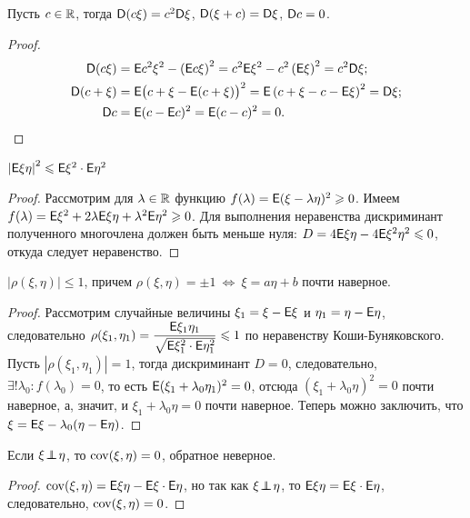 \begin{property}
	Пусть $c \in \mathbb{R}$, тогда $\mathsf{D} (c \xi ) = c^2 \mathsf{D} \xi$, $\mathsf{D} (\xi + c ) =  \mathsf{D} \xi$, $\mathsf{D} c = 0$.
	\begin{proof}
		\vspace{-2pc}
		\begin{align*}
			\mathsf{D} (c \xi ) &= \mathsf{E} c^2 \xi^2 - \left( \mathsf{E} c \xi \right)^2 = c^2 \mathsf{E} \xi^2 - c^2 \left( \mathsf{E} \xi \right)^2 = c^2 \mathsf{D} \xi;\\
			\mathsf{D} ( c + \xi ) &= \mathsf{E} \big( c + \xi - \mathsf{E} ( c + \xi ) \big)^2 = \mathsf{E} \left( c + \xi - c - \mathsf{E} \xi  \right)^2 = \mathsf{D} \xi; \\
			\mathsf{D} c &= \mathsf{E} (c - \mathsf{E} c )^2 = \mathsf{E} (c - c)^2 = 0. \qedhere
		\end{align*} 
	\end{proof}
\end{property}

\begin{property}
	$\left| \mathsf{E} \xi \eta \right|^2 \leqslant \mathsf{E} \xi^2 \cdot \mathsf{E} \eta^2$
	\begin{proof}
		Рассмотрим для $\lambda \in \mathbb{R}$ функцию $f( \lambda ) = \mathsf{E} (\xi - \lambda \eta)^2 \geqslant 0$. Имеем $f( \lambda ) = \mathsf{E} \xi^2 + 2 \lambda \mathsf{E} \xi \eta + \lambda^2 \mathsf{E} \eta^2 \geqslant 0$. Для выполнения неравенства дискриминант  полученного многочлена должен быть меньше нуля: $D = 4 \mathsf{E} \xi \eta - 4 \mathsf{E} \xi^2 \eta^2 \leqslant 0$, откуда следует неравенство.
	\end{proof}
\end{property}

\begin{property}
	$| \rho (\xi , \eta ) | \leqslant 1$, причем $\rho ( \xi , \eta ) = \pm 1 ~\Leftrightarrow~ \xi = a \eta + b$ почти наверное.
	\begin{proof}
		Рассмотрим случайные величины $\xi_1 = \xi - \mathsf{E} \xi$ и $\eta_1 = \eta - \mathsf{E} \eta$, следовательно $\rho ( \xi_1 , \eta_1 ) = \dfrac{\mathsf{E} \xi_1 \eta_1}{\sqrt{\mathsf{E} \xi_1^2 \cdot \mathsf{E} \eta_1^2}} \leqslant 1$ по неравенству Коши-Буняковского. Пусть $| \rho (\xi_1, \eta_1)| = 1$, тогда дискриминант $D = 0$, следовательно, $\exists !\lambda_0: f(\lambda_0) = 0$,  то есть $\mathsf{E} ( \xi_1 + \lambda_0 \eta_1 )^2 = 0$, отсюда $(\xi_1 + \lambda_0 \eta )^2 = 0$ почти наверное, а, значит, и $\xi_1 + \lambda_0 \eta  = 0$ почти наверное. Теперь можно заключить, что $\xi = \mathsf{E} \xi - \lambda_0 (\eta - \mathsf{E} \eta )$.
	\end{proof}
\end{property}

\begin{property} 
	Если $\xi \!\perp\!\!\!\!\perp\! \eta$, то $\operatorname{cov} (\xi, \eta) = 0$, обратное неверное.
	\begin{proof}
			$\operatorname{cov}( \xi, \eta) = \mathsf{E} \xi \eta - \mathsf{E} \xi \cdot \mathsf{E} \eta$, но так как $\xi \!\perp\!\!\!\!\perp\! \eta$, то $\mathsf{E} \xi \eta = \mathsf{E} \xi \cdot \mathsf{E} \eta$, следовательно, $\operatorname{cov}( \xi, \eta ) = 0$.
	\end{proof}
\end{property}

